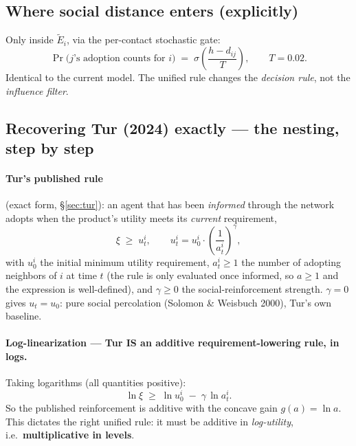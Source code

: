 \documentclass[11pt,a4paper]{article}
\newcommand{\Ee}{\tilde{E}}                 %
\begin{document}
\subsection{Where social distance enters (explicitly)}

Only inside $\Ee_i$, via the per-contact stochastic gate:
\begin{equation}
  \Pr\bigl(\text{$j$'s adoption counts for $i$}\bigr) \;=\; \sigma\!\left(\frac{h - d_{ij}}{T}\right),
  \qquad T = 0.02 .
\end{equation}
Identical to the current model. The unified rule changes the \emph{decision rule}, not
the \emph{influence filter}.

\subsection{Recovering Tur (2024) exactly --- the nesting, step by step}
\label{sec:turnesting}

\paragraph{Tur's published rule} (exact form, \S\ref{sec:tur}): an agent that has been
\emph{informed} through the network adopts when the product's utility meets its
\emph{current} requirement,
\begin{equation}
  \xi \;\ge\; u_t^i, \qquad u_t^i = u_0^i \cdot \left(\frac{1}{a_t^i}\right)^{\gamma},
\end{equation}
with $u_0^i$ the initial minimum utility requirement, $a_t^i \ge 1$ the number of adopting
neighbors of $i$ at time $t$ (the rule is only evaluated once informed, so $a \ge 1$ and
the expression is well-defined), and $\gamma \ge 0$ the social-reinforcement strength.
$\gamma = 0$ gives $u_t = u_0$: pure social percolation (Solomon \& Weisbuch 2000), Tur's
own baseline.

\paragraph{Log-linearization --- Tur IS an additive requirement-lowering rule, in logs.}
Taking logarithms (all quantities positive):
\begin{equation}
  \ln \xi \;\ge\; \ln u_0^i \;-\; \gamma \,\ln a_t^i .
  \label{eq:logtur}
\end{equation}
So the published reinforcement is additive with the concave gain $g(a) = \ln a$. This
dictates the right unified rule: it must be additive in \emph{log-utility}, i.e.\
\textbf{multiplicative in levels}.
\end{document}
